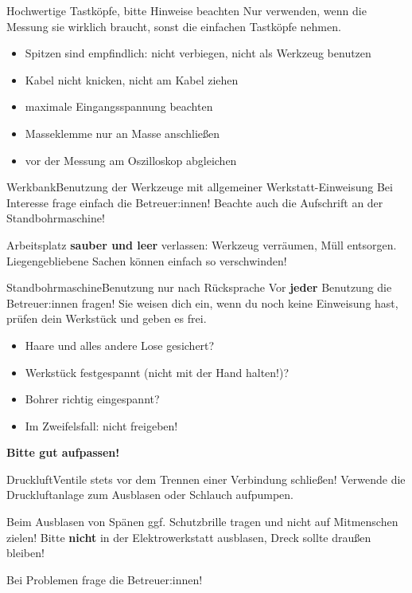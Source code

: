 \begin{schild}[farbe=gelbgruen, modell=bis 350\,MHz, einweisung=werkstatt-einweisung]
	{Hochwertige Tastköpfe}{\werkstattEinweisung, bitte Hinweise beachten}
Nur verwenden, wenn die Messung sie wirklich braucht, sonst die einfachen Tastköpfe nehmen.
\begin{itemize}
	\item Spitzen sind empfindlich: nicht verbiegen, nicht als Werkzeug benutzen
	\item Kabel nicht knicken, nicht am Kabel ziehen
	\item maximale Eingangsspannung beachten
	\item Masseklemme nur an Masse anschließen
	\item vor der Messung am Oszilloskop abgleichen
\end{itemize}
\end{schild}

\begin{schild}[farbe=gruen, einweisung=werkstatt-einweisung]
	{Werkbank}{Benutzung der Werkzeuge mit allgemeiner Werkstatt-Einweisung}
Bei Interesse frage einfach die Betreuer:innen!
Beachte auch die Aufschrift an der Standbohrmaschine!

Arbeitsplatz \textbf{sauber und leer} verlassen: Werkzeug verräumen, Müll entsorgen.
Liegengebliebene Sachen können einfach so verschwinden!
\end{schild}

\begin{schild}[farbe=rot, einweisung=werkstatt-einweisung]
	{Standbohrmaschine}{Benutzung nur nach Rücksprache}
Vor \textbf{jeder} Benutzung die Betreuer:innen fragen! Sie weisen dich ein, wenn du
noch keine Einweisung hast, prüfen dein Werkstück und geben es frei.
\begin{itemize}
	\item Haare und alles andere Lose gesichert?
	\item Werkstück festgespannt (nicht mit der Hand halten!)?
	\item Bohrer richtig eingespannt?
	\item Im Zweifelsfall: nicht freigeben!
\end{itemize}
\textbf{Bitte gut aufpassen!}
\end{schild}

\begin{schild}[farbe=gruen]
	{Druckluft}{Ventile stets vor dem Trennen einer Verbindung schließen!}
Verwende die Druckluftanlage zum Ausblasen oder Schlauch aufpumpen.

Beim Ausblasen von Spänen ggf. Schutzbrille tragen und nicht auf Mitmenschen zielen!
Bitte \textbf{nicht} in der Elektrowerkstatt ausblasen, Dreck sollte draußen bleiben!

Bei Problemen frage die Betreuer:innen!
\end{schild}

